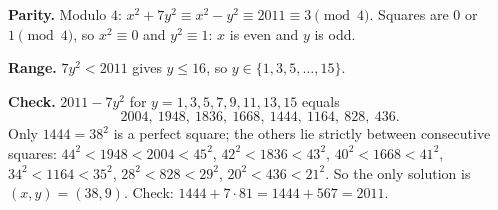 \textbf{Parity.} Modulo $4$: $x^2+7y^2\equiv x^2-y^2\equiv2011\equiv3\pmod4$. Squares are $0$ or $1\pmod4$, so $x^2\equiv0$ and $y^2\equiv1$: $x$ is even and $y$ is odd.

\textbf{Range.} $7y^2<2011$ gives $y\le16$, so $y\in\{1,3,5,\dots,15\}$.

\textbf{Check.} $2011-7y^2$ for $y=1,3,5,7,9,11,13,15$ equals
\[
2004,\ 1948,\ 1836,\ 1668,\ 1444,\ 1164,\ 828,\ 436 .
\]
Only $1444=38^2$ is a perfect square; the others lie strictly between consecutive squares: $44^2<1948<2004<45^2$, $42^2<1836<43^2$, $40^2<1668<41^2$, $34^2<1164<35^2$, $28^2<828<29^2$, $20^2<436<21^2$. So the only solution is $\boxed{(x,y)=(38,9)}$. Check: $1444+7\cdot81=1444+567=2011$.
